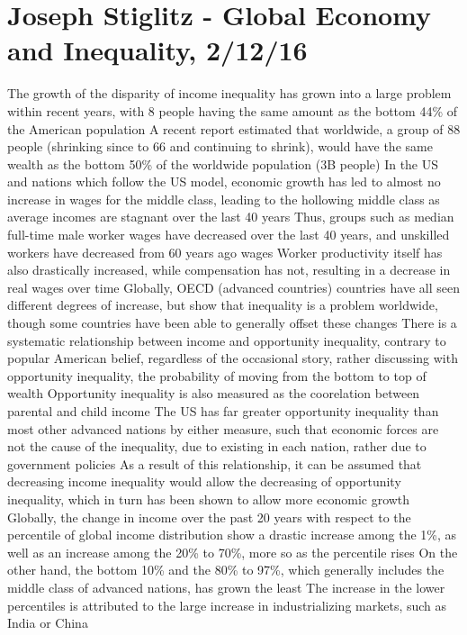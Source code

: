 \documentclass[11 pt, twoside]{article}
\newenvironment{outline*}
{
	\begin{outline}[enumerate]
	}
	{\end{outline}
}
\begin{document}
\section{Joseph Stiglitz - Global Economy and Inequality, 2/12/16}
\begin{outline*}
\1 The growth of the disparity of income inequality has grown into a large problem within recent years, with 8 people having the same amount as the bottom 44\% of the American population
\2 A recent report estimated that worldwide, a group of 88 people (shrinking since to 66 and continuing to shrink), would have the same wealth as the bottom 50\% of the worldwide population (3B people)
\2 In the US and nations which follow the US model, economic growth has led to almost no increase in wages for the middle class, leading to the hollowing middle class as average incomes are stagnant over the last 40 years
\3 Thus, groups such as median full-time male worker wages have decreased over the last 40 years, and unskilled workers have decreased from 60 years ago wages
\2 Worker productivity itself has also drastically increased, while compensation has not, resulting in a decrease in real wages over time
\2 Globally, OECD (advanced countries) countries have all seen different degrees of increase, but show that inequality is a problem worldwide, though some countries have been able to generally offset these changes
\1 There is a systematic relationship between income and opportunity inequality, contrary to popular American belief, regardless of the occasional story, rather discussing with opportunity inequality, the probability of moving from the bottom to top of wealth
\2 Opportunity inequality is also measured as the coorelation between parental and child income
\2 The US has far greater opportunity inequality than most other advanced nations by either measure, such that economic forces are not the cause of the inequality, due to existing in each nation, rather due to government policies
\1 As a result of this relationship, it can be assumed that decreasing income inequality would allow the decreasing of opportunity inequality, which in turn has been shown to allow more economic growth
\1 Globally, the change in income over the past 20 years with respect to the percentile of global income distribution show a drastic increase among the 1\%, as well as an increase among the 20\% to 70\%, more so as the percentile rises
\2 On the other hand, the bottom 10\% and the 80\% to 97\%, which generally includes the middle class of advanced nations, has grown the least
\2 The increase in the lower percentiles is attributed to the large increase in industrializing markets, such as India or China

\end{outline*}
\end{document}

